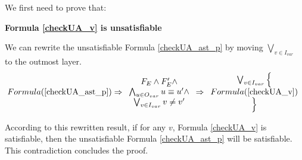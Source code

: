 \documentclass[journal]{IEEEtran}
\begin{document}
We first need to prove that:
\vspace{0.2cm}
\begin{theorem}[]\label{thm_checkUA_v}
\textbf{Formula \ref{checkUA_v} is unsatisfiable}
\end{theorem}
\begin{IEEEproof}
%
We can rewrite the unsatisfiable Formula \ref{checkUA_ast_p} by moving $\bigvee_{v\in I_{var}}$ to the outmost layer.
\begin{displaymath}\label{checkUA_rew}
Formula (\ref{checkUA_ast_p})\Rightarrow
\begin{array}{c}
F_E\wedge F'_E\wedge \\
\bigwedge_{u\in O_{var}} u\equiv u'\wedge \\
\bigvee_{v\in I_{var}}v\ne v'
\end{array}
\Rightarrow
\begin{array}{c}
\bigvee_{v\in I_{var}}\Big\{\\
Formula (\ref{checkUA_v})\\
\Big\}
\end{array}
\end{displaymath}

According to this rewritten result,
if for any $v$,
Formula \ref{checkUA_v} is satisfiable,
then the unsatisfiable Formula \ref{checkUA_ast_p} will be satisfiable.
This contradiction concludes the proof.
\end{IEEEproof}
\end{document}
